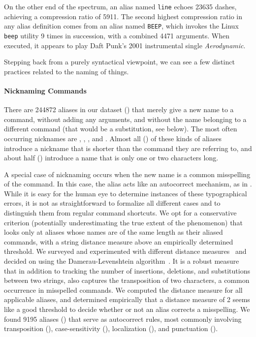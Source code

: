 On the other end of the spectrum, an alias named \texttt{line} echoes \num{23635} dashes, achieving a compression ratio of \num{5911}.
The second highest compression ratio in any alias definition comes from an alias named \verb|BEEP|, which invokes the Linux \verb|beep| utility 9 times in succession, with a combined \num{4471} arguments.
When executed, it appears to play Daft Punk's 2001 instrumental single \emph{Aerodynamic}.

Stepping back from a purely syntactical viewpoint, we can see a few distinct practices related to the naming of things.

\paragraph{\bf Nicknaming Commands}

There are \num{244872} aliases in our dataset () that merely give a new name to a command, without adding any arguments, and without the name belonging to a different command (that would be a substitution, see below).
The most often occurring nicknames are , , , and .
Almost all () of these kinds of aliases introduce a nickname that is shorter than the command they are referring to, and about half () introduce a name that is only one or two characters long.

A special case of nicknaming occurs when the new name is a common misspelling of the command.
In this case, the alias acts like an autocorrect mechanism, as in .
While it is easy for the human eye to determine instances of these typographical errors, it is not as straightforward to formalize all different cases and to distinguish them from regular command shortcuts.
We opt for a conservative criterion (potentially underestimating the true extent of the phenomenon) that looks only at aliases whose names are of the same length as their aliased commands, with a string distance measure above an empirically determined threshold.
We surveyed and experimented with different distance measures~\cite{navarro:01} and decided on using the Damerau-Levenshtein algorithm~\cite{damerau:64}.
It is a robust measure that in addition to tracking the number of insertions, deletions, and substitutions between two strings, also captures the transposition of two characters, a common occurrence in misspelled commands.
We computed the distance measure for all applicable aliases, and determined empirically that a distance measure of 2 seems like a good threshold to decide whether or not an alias corrects a misspelling.
We found \num{9195} aliases () that serve as autocorrect rules, most commonly involving transposition (), case-sensitivity (), localization (), and punctuation ().


